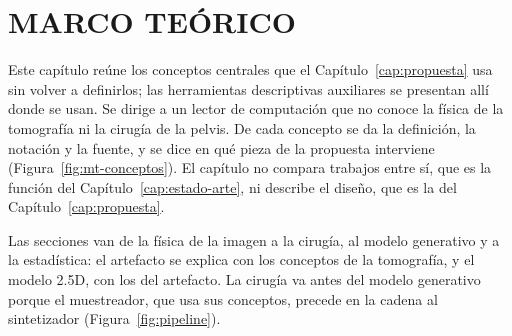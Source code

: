 \chapter{MARCO TEÓRICO}\label{cap:marco}

Este capítulo reúne los conceptos centrales que el Capítulo~\ref{cap:propuesta} usa sin volver a definirlos; las herramientas descriptivas auxiliares se presentan allí donde se usan. Se dirige a un lector de computación que no conoce la física de la tomografía ni la cirugía de la pelvis. De cada concepto se da la definición, la notación y la fuente, y se dice en qué pieza de la propuesta interviene (Figura~\ref{fig:mt-conceptos}). El capítulo no compara trabajos entre sí, que es la función del Capítulo~\ref{cap:estado-arte}, ni describe el diseño, que es la del Capítulo~\ref{cap:propuesta}.

Las secciones van de la física de la imagen a la cirugía, al modelo generativo y a la estadística: el artefacto se explica con los conceptos de la tomografía, y el modelo 2.5D, con los del artefacto. La cirugía va antes del modelo generativo porque el muestreador, que usa sus conceptos, precede en la cadena al sintetizador (Figura~\ref{fig:pipeline}).

